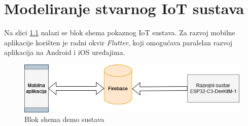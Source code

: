 \chapter{Modeliranje stvarnog IoT sustava}

Na slici \ref{fig:stvarni_slucaj} nalazi se blok shema pokaznog IoT sustava. Za razvoj mobilne aplikacije korišten je radni okvir \textit{Flutter}, koji omogućava paralelan razvoj aplikacija na Android i iOS uređajima. 

\begin{figure}[ht]
	\centering
	\includegraphics[scale=0.6]{imgs/stvarni_slucaj}
	\caption{Blok shema demo sustava}
	\label{fig:stvarni_slucaj}
\end{figure}

\eject